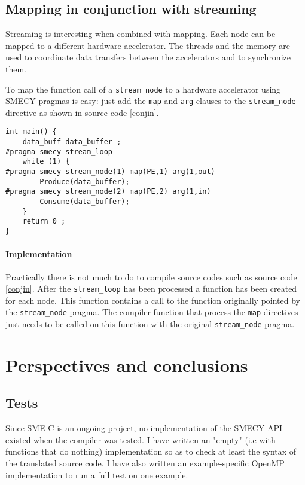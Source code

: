 \documentclass [A4]{article}
\begin{document}
	
	\subsection{Mapping in conjunction with streaming}
	Streaming is interesting when combined with mapping. Each node can be mapped to a different hardware accelerator. The threads and the memory are used to coordinate data transfers between the accelerators and to synchronize them.
	
	To map the function call of a \verb+stream_node+ to a hardware accelerator using SMECY pragmas is easy: just add the \verb+map+ and \verb+arg+ clauses to the \verb+stream_node+ directive as shown in source code \ref{conjin}.
		
	\begin{lstlisting}[label=conjin,caption={Input code with streaming and mapping pragmas. Definitions of functions \texttt{Produce} and \texttt{Consume} are not shown.}]
int main() {
	data_buff data_buffer ;
#pragma smecy stream_loop
	while (1) {
#pragma smecy stream_node(1) map(PE,1) arg(1,out)
		Produce(data_buffer);
#pragma smecy stream_node(2) map(PE,2) arg(1,in)
		Consume(data_buffer);
	}
	return 0 ;
}
	\end{lstlisting}
	
	\paragraph{Implementation} Practically there is not much to do to compile source codes such as source code \ref{conjin}. After the \verb+stream_loop+ has been processed a function has been created for each node. This function contains a call to the function originally pointed by the \verb+stream_node+ pragma. The compiler function that process the \verb+map+ directives just needs to be called on this function with the original \verb+stream_node+ pragma.

\section{Perspectives and conclusions}
	\subsection{Tests}
	Since SME-C is an ongoing project, no implementation of the SMECY API existed when the compiler was tested. I have written an "empty" (i.e with functions that do nothing) implementation so as to check at least the syntax of the translated source code. I have also written an example-specific OpenMP implementation to run a full test on one example.
	
\end{document}
